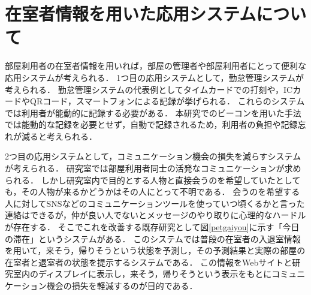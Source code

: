 
\section{在室者情報を用いた応用システムについて}\label{3.4}
部屋利用者の在室者情報を用いれば，部屋の管理者や部屋利用者にとって便利な応用システムが考えられる．
1つ目の応用システムとして，勤怠管理システムが考えられる．
勤怠管理システムの代表例としてタイムカードでの打刻や，ICカードやQRコード，スマートフォンによる記録が挙げられる．
これらのシステムでは利用者が能動的に記録する必要がある．
本研究でのビーコンを用いた手法では能動的な記録を必要とせず，自動で記録されるため，利用者の負担や記録忘れが減ると考えられる．

2つ目の応用システムとして，コミュニケーション機会の損失を減らすシステムが考えられる．
研究室では部屋利用者同士の活発なコミュニケーションが求められる．
しかし研究室内で目的とする人物と直接会うのを希望していたとしても，その人物が来るかどうかはその人にとって不明である．
会うのを希望する人に対してSNSなどのコミュニケーションツールを使っていつ頃くるかと言った連絡はできるが，仲が良い人でないとメッセージのやり取りに心理的なハードルが存在する．
そこでこれを改善する既存研究として図\ref{petgaiyou}に示す「今日の滞在」というシステムがある．
このシステムでは普段の在室者の入退室情報を用いて，来そう，帰りそうという状態を予測し，その予測結果と実際の部屋の在室者と退室者の状態を提示するシステムである．
この情報をWebサイトと研究室内のディスプレイに表示し，来そう，帰りそうという表示をもとにコミュニケーション機会の損失を軽減するのが目的である．

